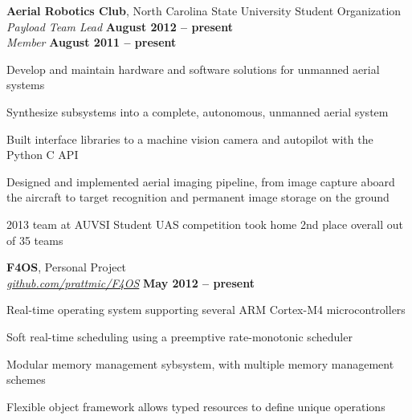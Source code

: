 \documentclass[margin,line,letterpaper]{resume}
\begin{document}
\begin{resume}
    \textbf{Aerial Robotics Club}, North Carolina State University Student Organization \vspace{1mm}\\\vspace{1mm}%
    \textsl{Payload Team Lead} \hfill \textbf{August 2012 -- present}\\
    \textsl{Member} \hfill \textbf{August 2011 -- present}\vspace{-3mm}\\
    \begin{list2}
    \item Develop and maintain hardware and software solutions for unmanned aerial systems
    \item Synthesize subsystems into a complete, autonomous, unmanned aerial system
    \item Built interface libraries to a machine vision camera and autopilot with the Python C API
    \item Designed and implemented aerial imaging pipeline, from image capture aboard the aircraft
        to target recognition and permanent image storage on the ground
    \item 2013 team at AUVSI Student UAS competition took home 2nd place overall out of 35 teams
    \end{list2}\vspace{-1.5mm}

    \textbf{F4OS}, Personal Project\vspace{1mm}\\\vspace{1mm}%
    \textsl{\href{http://github.com/prattmic/F4OS}{github.com/prattmic/F4OS}}  \hfill \textbf{May 2012 -- present} \vspace{-3mm}\\\vspace{-1mm}%
    \begin{list2}
    \item Real-time operating system supporting several ARM Cortex-M4 microcontrollers
    \item Soft real-time scheduling using a preemptive rate-monotonic scheduler
    \item Modular memory management sybsystem, with multiple memory management schemes
    \item Flexible object framework allows typed resources to define unique operations
    \end{list2}\vspace{-1.5mm}


\end{resume}
\end{document}
